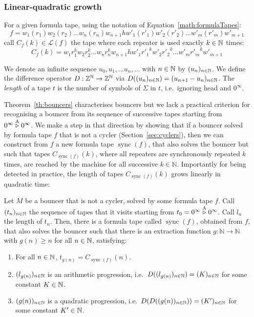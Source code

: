 \subsubsection{Linear-quadratic growth}

For a given formula tape, using the notation of Equation~\ref{math:formulaTapes}: $$f=w_1(r_1)w_2(r_2)\dots w_n(r_n) w_{n+1} h w'_1(r'_1)w'_2(r'_2)\dots w'_m(r'_m) w'_{m+1}$$ call $C_f(k) \in \mathcal{L}(f)$ the tape where each repeater is used exactly $k \in \mathbb{N}$ times: $$C_f(k)=w_1 r_1^k w_2 r_2^k\dots w_n r_n^k w_{n+1} h w'_1 {r'_1}^k w'_2 {r'_2}^k \dots w'_m {r'_m}^k w'_{m+1}$$

We denote an infinite sequence $u_0, u_1, \dots u_n, \dots$ with $n\in\mathbb{N}$ by $(u_n)_{n\in\mathbb{N}}$. We define the difference operator $D: \mathbb{Z}^{\mathbb{N}} \to \mathbb{Z}^{\mathbb{N}}$ via $D((u_n)_{n\in\mathbb{N}})=(u_{n+1}-u_{n})_{n\in\mathbb{N}}$. The \textit{length} of a tape $t$ is the number of symbols of $\Sigma$ in $t$, i.e.\ ignoring head and $0^\infty$.

\newcommand{\sync}[1]{\operatorname{sync}(#1)}

Theorem~\ref{th:bouncers} characterises bouncers but we lack a practical criterion for recognising a bouncer from its sequence of successive tapes starting from $0^\infty \stackrel{\text{A}}\triangleright 0^\infty$. We make a step in that direction by showing that if a bouncer solved by formula tape $f$ that is not a cycler (Section~\ref{sec:cyclers}), then we can construct from $f$ a new formula tape $\sync{f}$, that also solves the bouncer but such that tapes $C_{\sync{f}}(k)$, where all repeaters are synchronously repeated $k$ times, are reached by the machine for all successive $k\in\mathbb{N}$. Importantly for being detected in practice, the length of tapes $C_{\sync{f}}(k)$ grows linearly in quadratic time:



\begin{theorem}\label{th:linquad}
    Let $M$ be a bouncer that is not a cycler, solved by some formula tape $f$. Call $(t_n)_{n\in\mathbb{N}}$ the sequence of tapes that it visits starting from $t_0 = 0^\infty \stackrel{\text{A}}\triangleright 0^\infty$. Call $l_n$ the length of $t_n$. Then, there is a formula tape called $\sync{f}$, obtained from $f$, that also solves the bouncer such that there is an extraction function $g: \mathbb{N} \to \mathbb{N}$ with $g(n) \geq n$ for all $n\in\mathbb{N}$, satisfying:

    \begin{enumerate}
        \item For all $n\in\mathbb{N}$, $t_{g(n)} = C_{\sync{f}}(n)$.
        \item $(l_{g(n)})_{n\in\mathbb{N}}$ is an arithmetic progression, i.e.\ $D((l_{g(n)})_{n\in\mathbb{N}}) = (K)_{n\in\mathbb{N}}$ for some constant $K\in\mathbb{N}$.
        \item $(g(n))_{n\in\mathbb{N}}$ is a quadratic progression, i.e.\ $D(D((g(n))_{n\in\mathbb{N}})) = (K')_{n\in\mathbb{N}}$ for some constant $K'\in\mathbb{N}$.
    \end{enumerate}
\end{theorem}

